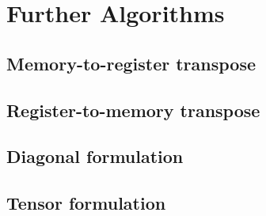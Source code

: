 \chapter{Further Algorithms}
\label{chapter:furtheralgs}


\section{Memory-to-register transpose}
\section{Register-to-memory transpose}
\section{Diagonal formulation}
\section{Tensor formulation}
